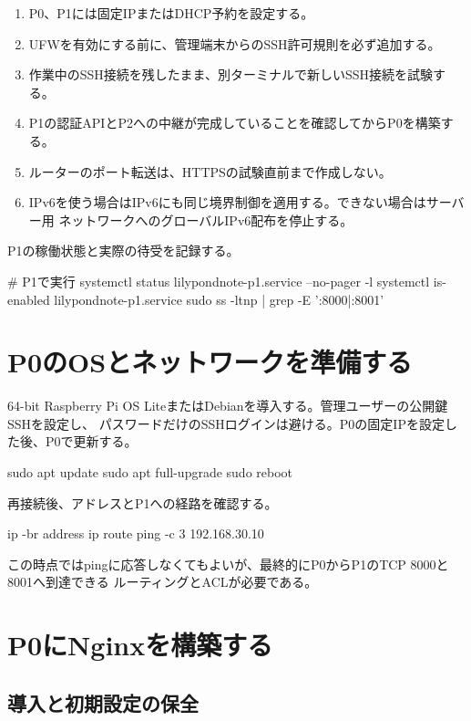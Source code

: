 \documentclass[uplatex,a4paper,11pt]{jsarticle}
\begin{document}
\begin{enumerate}
  \item P0、P1には固定IPまたはDHCP予約を設定する。
  \item UFWを有効にする前に、管理端末からのSSH許可規則を必ず追加する。
  \item 作業中のSSH接続を残したまま、別ターミナルで新しいSSH接続を試験する。
  \item P1の認証APIとP2への中継が完成していることを確認してからP0を構築する。
  \item ルーターのポート転送は、HTTPSの試験直前まで作成しない。
  \item IPv6を使う場合はIPv6にも同じ境界制御を適用する。できない場合はサーバー用
        ネットワークへのグローバルIPv6配布を停止する。
\end{enumerate}

P1の稼働状態と実際の待受を記録する。

\begin{command}
# P1で実行
systemctl status lilypondnote-p1.service --no-pager -l
systemctl is-enabled lilypondnote-p1.service
sudo ss -ltnp | grep -E ':8000|:8001'
\end{command}

\section{P0のOSとネットワークを準備する}

64-bit Raspberry Pi OS LiteまたはDebianを導入する。管理ユーザーの公開鍵SSHを設定し、
パスワードだけのSSHログインは避ける。P0の固定IPを設定した後、P0で更新する。

\begin{command}
sudo apt update
sudo apt full-upgrade
sudo reboot
\end{command}

再接続後、アドレスとP1への経路を確認する。

\begin{command}
ip -br address
ip route
ping -c 3 192.168.30.10
\end{command}

この時点ではpingに応答しなくてもよいが、最終的にP0からP1のTCP 8000と8001へ到達できる
ルーティングとACLが必要である。

\section{P0にNginxを構築する}

\subsection{導入と初期設定の保全}
\end{document}
